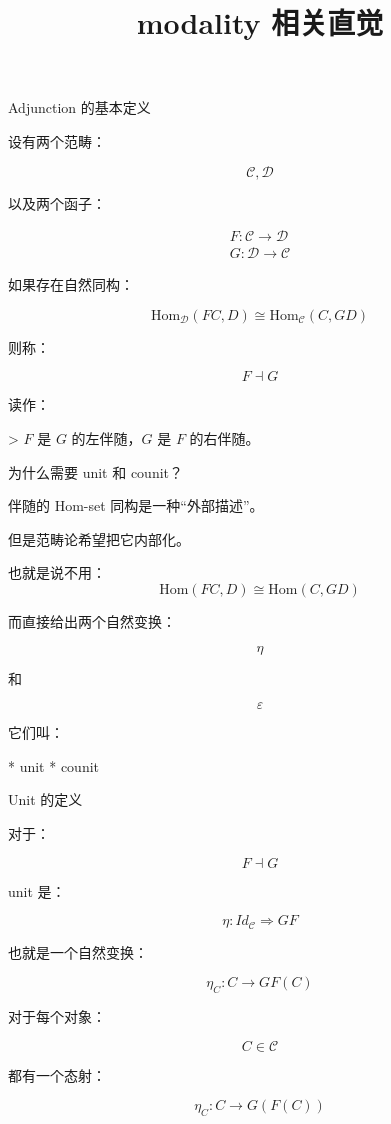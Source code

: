 \documentclass{beamer}
\title{modality 相关直觉}
\date{}
\begin{document}
\begin{frame}
    \titlepage
\end{frame}

\begin{frame}[fragile]{Adjunction 的基本定义}
\begin{markdown}
设有两个范畴：

$$
\mathcal C,\mathcal D
$$

以及两个函子：

$$
\begin{gathered}
F:\mathcal C\to\mathcal D \\
G:\mathcal D\to\mathcal C
\end{gathered}
$$

如果存在自然同构：

$$
\mathrm{Hom}_{\mathcal D}(F C,D)
\cong
\mathrm{Hom}_{\mathcal C}(C,G D)
$$

则称：

$$
F\dashv G
$$

读作：

> $F$ 是 $G$ 的左伴随，$G$ 是 $F$ 的右伴随。
\end{markdown}
\end{frame}

\begin{frame}[fragile]{为什么需要 unit 和 counit？}
\begin{markdown}
伴随的 Hom-set 同构是一种“外部描述”。

但是范畴论希望把它内部化。

也就是说不用：
$$
\mathrm{Hom}(FC,D)
\cong
\mathrm{Hom}(C,GD)
$$

而直接给出两个自然变换：

$$
\eta
$$

和

$$
\varepsilon
$$

它们叫：

* unit
* counit
\end{markdown}
\end{frame}

\begin{frame}[fragile]{Unit 的定义}
\begin{markdown}
对于：

$$
F\dashv G
$$

unit 是：

$$
\boxed{
\eta:
Id_{\mathcal C}
\Rightarrow
GF
}
$$

也就是一个自然变换：

$$
\eta_C:C\to GF(C)
$$

对于每个对象：

$$
C\in\mathcal C
$$

都有一个态射：

$$
\eta_C:C\rightarrow G(F(C))
$$
\end{markdown}
\end{frame}
\end{document}
